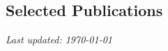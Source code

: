 \documentclass[letterpaper, 11pt]{article}
\begin{document}
\thispagestyle{empty}





%  


% 
% 

\subsection*{Selected Publications}
\renewcommand*{\labelenumi}{[S\theenumi]}

% 
% 
%  

{\noindent\it Last updated: \today}
\end{document}
